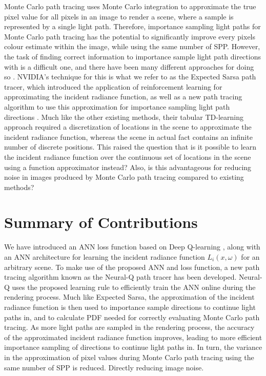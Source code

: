 \documentclass[../dissertation.tex]{subfiles}
\begin{document}
Monte Carlo path tracing uses Monte Carlo integration to approximate the true pixel value for all pixels in an image to render a scene, where a sample is represented by a single light path. Therefore, importance sampling light paths for Monte Carlo path tracing has the potential to significantly improve every pixels colour estimate within the image, while using the same number of SPP. However, the task of finding correct information to importance sample light path directions with is a difficult one, and there have been many different approaches for doing so \cite{vorba2014line, muller2017practical, dahm2017learning}. NVIDIA's technique for this is what we refer to as the Expected Sarsa path tracer, which introduced the application of reinforcement learning for approximating the incident radiance function, as well as a new path tracing algorithm to use this approximation for importance sampling light path directions \cite{dahm2017learning}. Much like the other existing methods, their tabular TD-learning approach required a discretization of locations in the scene to approximate the incident radiance function, whereas the scene in actual fact contains an infinite number of discrete positions. This raised the question that is it possible to learn the incident radiance function over the continuous set of locations in the scene using a function approximator instead? Also, is this advantageous for reducing noise in images produced by Monte Carlo path tracing compared to existing methods?

\section{Summary of Contributions}

We have introduced an ANN loss function based on Deep Q-learning \cite{mnih2013playing}, along with an ANN architecture for learning the incident radiance function $L_i(x, \omega)$ \cite{kajiya1986rendering} for an arbitrary scene. To make use of the proposed ANN and loss function, a new path tracing algorithm known as the Neural-Q path tracer has been developed. Neural-Q uses the proposed learning rule to efficiently train the ANN online during the rendering process. Much like Expected Sarsa, the approximation of the incident radiance function is then used to importance sample directions to continue light paths in, and to calculate PDF needed for correctly evaluating Monte Carlo path tracing. As more light paths are sampled in the rendering process, the accuracy of the approximated incident radiance function improves, leading to more efficient importance sampling of directions to continue light paths in. In turn, the variance in the approximation of pixel values during Monte Carlo path tracing using the same number of SPP is reduced. Directly reducing image noise. 
\end{document}

